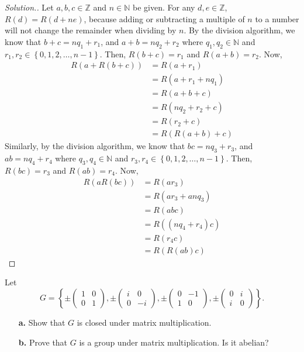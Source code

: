 \documentclass{article}
\newcounter{exercise}
\newenvironment{exercise}{\addtocounter{exercise}{1} \noindent{\bf{Exercise \theexercise.}}}{\vspace{.5cm}}
\newcommand{\N}[0]{\mathbb{N}}
\newcommand{\Z}[0]{\mathbb{Z}}
\newcommand{\set}[1]{\left\{#1\right\}}
\newcommand{\mat}[4]{\left( \begin{array}{cc} #1 & #2 \\ #3 & #4  \end{array} \right)}
\begin{document}
\begin{proof}[Solution.]
Let $a,b,c\in\Z$ and $n\in\N$ be given. For any $d,e\in\Z$, $R(d)=R(d+ne)$, because adding or subtracting a multiple of $n$ to a number will not change the remainder when dividing by $n$. 
By the division algorithm, we know that $b+c=nq_1+r_1$, and $a+b=nq_2+r_2$ where $q_1, q_2\in \N$ and $r_1, r_2\in\set{0,1,2,\dots, n-1}$. Then, $R(b+c)=r_1$ and $R(a+b)=r_2$. Now,
\[
\begin{split}
R(a + R(b + c))&= R(a+ r_1)\\
    &= R(a+r_1+nq_1)\\
    &= R(a+b+c)\\
    &= R(nq_2+r_2 + c)\\
    &= R(r_2 + c)\\
    &= R(R(a+b)+c)
\end{split}
\]
Similarly, by the division algorithm, we know that $bc=nq_3+r_3$, and $ab=nq_4+r_4$ where $q_3, q_4\in \N$ and $r_3, r_4\in\set{0,1,2,\dots, n-1}$. Then, $R(bc)=r_3$ and $R(ab)=r_4$. Now,
\[
\begin{split}
R(a  R(b  c))&= R(a r_3)\\
    &= R(ar_3+anq_3)\\
    &= R(abc)\\
    &= R((nq_4+r_4)c)\\
    &= R(r_4  c)\\
    &= R(R(ab)c)
\end{split}
\]
\end{proof}


\begin{exercise}
Let
\[
G = \left\{ \pm \mat{1}{0}{0}{1}, \pm \mat{i}{0}{0}{-i}, \pm \mat{0}{-1}{1}{0} ,\pm \mat{0}{i}{i}{0} \right\}.
\]
\begin{itemize}

\item[\bf a.]  Show that $G$ is closed under matrix multiplication.  

\item[\bf b.]  Prove that $G$ is a group under matrix multiplication.  Is it abelian?

\end{itemize}
\end{exercise}
\end{document}

